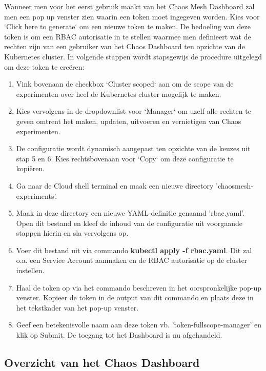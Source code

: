 Wanneer men voor het eerst gebruik maakt van het Chaos Mesh Dashboard zal men een pop up venster zien waarin een token moet ingegeven worden. Kies voor `Click here to generate` om een nieuwe token te maken. De bedoeling van deze token is om een RBAC autorisatie in te stellen waarmee men definieert wat de rechten zijn van een gebruiker van het Chaos Dashboard ten opzichte van de Kubernetes cluster. \autocite{ChaosMesh2022b} \newline In volgende stappen wordt stapsgewijs de procedure uitgelegd om deze token te creëren:
\begin{enumerate}
    \item Vink bovenaan de checkbox `Cluster scoped` aan om de scope van de experimenten over heel de Kubernetes cluster mogelijk te maken.
    \item Kies vervolgens in de dropdownlist voor `Manager` om uzelf alle rechten te geven omtrent het maken, updaten, uitvoeren en vernietigen van Chaos experimenten.
    \item De configuratie wordt dynamisch aangepast ten opzichte van de keuzes uit stap 5 en 6. Kies rechtsbovenaan voor `Copy` om deze configuratie te kopiëren.
    \item Ga naar de Cloud shell terminal en maak een nieuwe directory 'chaosmesh-experiments'. 
    \item Maak in deze directory een nieuwe YAML-definitie genaamd 'rbac.yaml'. Open dit bestand en kleef de inhoud van de configuratie uit voorgaande stappen hierin en sla vervolgens op.
    \item Voer dit bestand uit via commando {\bf kubectl apply -f rbac.yaml}. Dit zal o.a. een Service Account aanmaken en de RBAC autorisatie op de cluster instellen.
    \item Haal de token op via het commando beschreven in het oorspronkelijke pop-up venster. Kopieer de token in de output van dit commando en plaats deze in het tekstkader van het pop-up venster.
    \item Geef een betekenisvolle naam aan deze token vb. 'token-fullscope-manager' en klik op Submit. De toegang tot het Dashboard is nu afgehandeld.    
\end{enumerate}

\subsection{Overzicht van het Chaos Dashboard}

